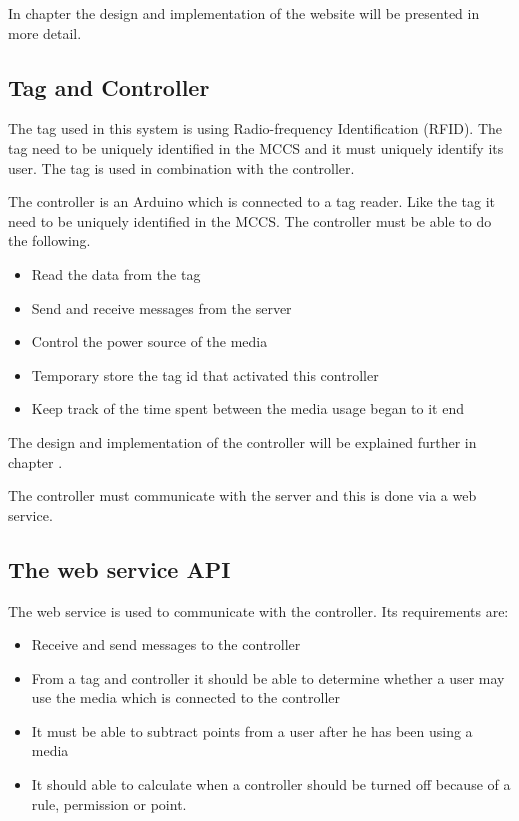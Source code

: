 In chapter  the design and implementation of the website will be presented in more detail. 
 

\subsection{Tag and Controller}
The tag used in this system is using Radio-frequency Identification (RFID). The tag need to be uniquely identified in the MCCS and it must uniquely identify its user. The tag is used in combination with the controller.

The controller is an Arduino which is connected to a tag reader. Like the tag it need to be uniquely identified in the MCCS. The controller must be able to do the following.

\begin{itemize}
	\item Read the data from the tag
	\item Send and receive messages from the server
	\item Control the power source of the media 
	\item Temporary store the tag id that activated this controller
	\item Keep track of the time spent between the media usage began to it end
\end{itemize}
 
The design and implementation of the controller will be explained further in chapter . 

The controller must communicate with the server and this is done via a web service.

\subsection{The web service API}
The web service is used to communicate with the controller. Its requirements are:
\begin{itemize}
	\item Receive and send messages to the controller
	\item From a tag and controller it should be able to determine whether a user may use the media which is connected to the controller
	\item It must be able to subtract points from a user after he has been using a media
	\item It should able to calculate when a controller should be turned off because of a rule, permission or point.
\end{itemize}

